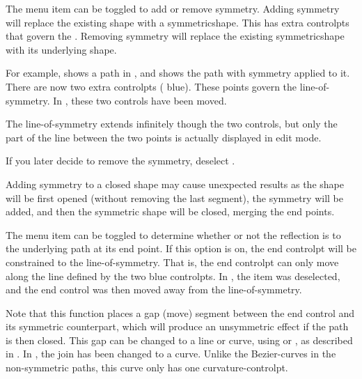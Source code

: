 
The  menu item can be toggled
to add or remove \gls{symmetry}. Adding symmetry will replace the existing
\gls{shape} with a \gls{symmetricshape}. This has extra
\glspl{controlpt} that govern the .
Removing \gls{symmetry} will replace the existing \gls{symmetricshape}
with its underlying \gls{shape}.

For example,  shows a \gls*{path}
in \editpathmode, and  shows the
path with \gls{symmetry} applied to it. There are now two extra
\glspl{controlpt} ( blue). These points govern the 
\gls{line-of-symmetry}. In , these two controls
have been moved.

\begin{information}
The \gls{line-of-symmetry} extends infinitely though the two controls,
but only the part of the line between the two points is actually
displayed in edit mode.
\end{information}

If you later decide to remove the symmetry, deselect
.

\begin{warning}
Adding \gls{symmetry} to a closed shape may cause unexpected
results as the shape will be first opened (without removing the
last segment), the \gls{symmetry} will be added, and then the symmetric
shape will be closed, merging the end points.
\end{warning}


The  menu item can be toggled to
determine whether or not the reflection is
 to the underlying
path at its end point. If this option is on, the end \gls{controlpt}
will be constrained to the \gls{line-of-symmetry}.  That is, the end
\gls{controlpt} can only move along the line defined by the two blue
\glspl*{controlpt}.  In , the
 item was deselected, and the
end control was then moved away from the \gls{line-of-symmetry}.

Note that this function places a \gls{gap} (move) segment between the
end control and its symmetric counterpart, which will produce an
unsymmetric effect if the path is then closed. This gap can be changed to
a line or curve, using  or
, as described in
. In ,
the join has been changed to a curve. Unlike the \glspl{Bezier-curve}
in the non-symmetric paths, this curve only has one 
\gls{curvature-controlpt}.

